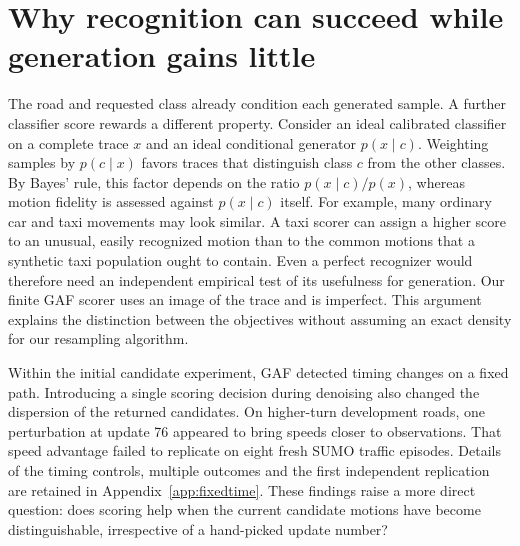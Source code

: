 \section{Why recognition can succeed while generation gains little}
The road and requested class already condition each generated sample. A further classifier score rewards a different property. Consider an ideal calibrated classifier on a complete trace $x$ and an ideal conditional generator $p(x\mid c)$. Weighting samples by $p(c\mid x)$ favors traces that distinguish class $c$ from the other classes. By Bayes' rule, this factor depends on the ratio $p(x\mid c)/p(x)$, whereas motion fidelity is assessed against $p(x\mid c)$ itself. For example, many ordinary car and taxi movements may look similar. A taxi scorer can assign a higher score to an unusual, easily recognized motion than to the common motions that a synthetic taxi population ought to contain. Even a perfect recognizer would therefore need an independent empirical test of its usefulness for generation. Our finite GAF scorer uses an image of the trace and is imperfect. This argument explains the distinction between the objectives without assuming an exact density for our resampling algorithm.

Within the initial candidate experiment, GAF detected timing changes on a fixed path. Introducing a single scoring decision during denoising also changed the dispersion of the returned candidates. On higher-turn development roads, one perturbation at update 76 appeared to bring speeds closer to observations. That speed advantage failed to replicate on eight fresh SUMO traffic episodes. Details of the timing controls, multiple outcomes and the first independent replication are retained in Appendix~\ref{app:fixedtime}. These findings raise a more direct question: does scoring help when the current candidate motions have become distinguishable, irrespective of a hand-picked update number?

